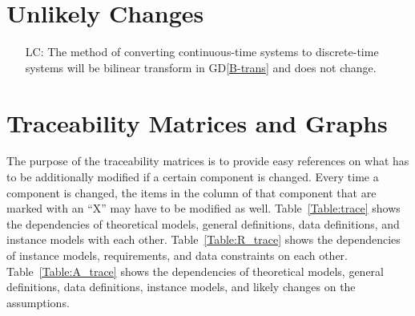 \documentclass[12pt]{article}
\newcounter{defnum} %
\newcommand{\dref}[1]{GD\ref{#1}} \newcounter{datadefnum} %
\begin{document}
\section{Unlikely Changes}    

\noindent \begin{itemize}

\item[LC\refstepcounter{lcnum}\thelcnum\label{LC_convert}:] The method of
converting continuous-time systems to discrete-time systems will be bilinear
transform in \dref{B-trans} and does not change.

\end{itemize}

\section{Traceability Matrices and Graphs}

The purpose of the traceability matrices is to provide easy references on what
has to be additionally modified if a certain component is changed.  Every time a
component is changed, the items in the column of that component that are marked
with an ``X'' may have to be modified as well.  Table~\ref{Table:trace} shows
the dependencies of theoretical models, general definitions, data definitions,
and instance models with each other. Table~\ref{Table:R_trace} shows the
dependencies of instance models, requirements, and data constraints on each
other. Table~\ref{Table:A_trace} shows the dependencies of theoretical models,
general definitions, data definitions, instance models, and likely changes on
the assumptions.
\end{document}
